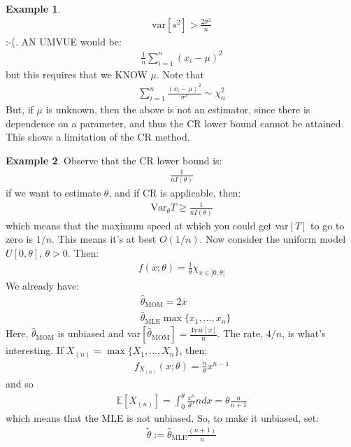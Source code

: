 \documentclass[11pt]{scrartcl}
\theoremstyle{definition}
\newtheorem{ex}{Example}
\theoremstyle{remark}
\newcommand{\EX}[1]{\mathbb{E}\left[#1 \right]}
\newcommand{\idx}[2]{\int_{#1}^{#2}}
\begin{document}
\begin{ex}
\begin{align*}
			\text{var}[s^2] > \frac{2\sigma^2}{n}
	\end{align*}
	:-(. AN UMVUE would be:
	\begin{align*}
			\frac{1}{n} \sum_{i=1}^n (x_i - \mu)^2 
	\end{align*}
	but this requires that we KNOW $\mu$. Note that
	\begin{align*}
	\sum_{i=1}^n \frac{(x_i- \mu)^2}{\sigma^2} \sim \chi_n^2
	\end{align*}
	But, if $\mu$ is unknown, then the above is not an estimator, since there is dependence on a parameter, and thus the CR lower bound cannot be attained. This shows a limitation of the CR method. 
\end{ex}

\begin{ex} 
	Observe that the CR lower bound is: 
	\begin{align*}
		\frac{1}{nI(\theta)}
	\end{align*}
	if we want to estimate $\theta$, and if CR is applicable, then: 
	\begin{align*}
		\text{Var}_\theta T \geq \frac{1}{nI(\theta)}
	\end{align*}	
	which means that the maximum speed at which you could get var$[T]$ to go to zero is $1/n$. This means it's at best $O(1/n)$. Now consider the uniform model $U[0, \theta]$, $\theta > 0$. Then: 
	\begin{align*}
		f(x; \theta) = \frac{1}{\theta} \chi_{x \in ]0, \theta[} 
	\end{align*}
	We already have: 
	\begin{align*}
			& \hat{\theta}_{\text{MOM}} = 2 \overline{x} \\
			& \hat{\theta}_{\text{MLE}} \max \{ x_1, ..., x_n \} 
	\end{align*}
	Here, $\hat{\theta}_{\text{MOM}}$ is unbiased and var$[\hat{\theta}_{\text{MOM}}] = \frac{4 \text{var}[x]}{n}$. The rate, $4/n$, is what's interesting. If $X_{(n)} = \max \{ X_1, ..., X_n \}$, then: 
	\begin{align*}
			f_{X_{(n)}}(x; \theta) = \frac{n}{\theta} x^{n-1} 
	\end{align*}
	and so 
	\begin{align*}
			\EX{X_{(n)}} = \idx{0}{\theta} \frac{x^n}{\theta^n} n dx = \theta \frac{n}{n+1}
	\end{align*}
	which means that the MLE is not unbiased. So, to make it unbiased, set: 
	\begin{align*}
			\widetilde{\theta} := \hat{\theta}_{\text{MLE}} \frac{(n+1)}{n}

\end{align*}
\end{ex}
\end{document}
